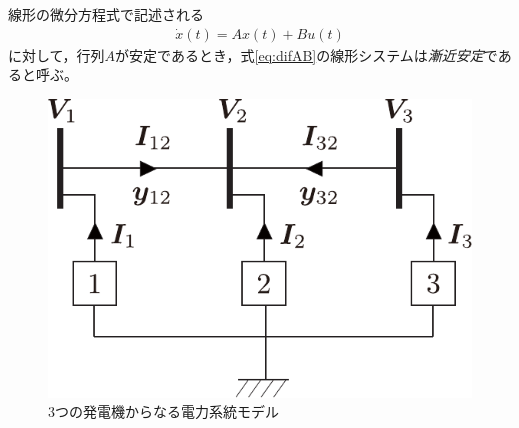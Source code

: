 \documentclass[tombow,dvipdfmx]{corona-a5}
\begin{document}
\begin{定義}\label{def:difsta}
線形の微分方程式で記述される
\begin{align}\label{eq:difAB}
\dot{x}(t)=Ax(t) +Bu(t)
\end{align}
に対して，行列$A$が安定であるとき，式\ref{eq:difAB}の線形システムは\emph{漸近安定}であると呼ぶ。
\end{定義}

\begin{figure}[t]
\centering
\includegraphics[width = .30\linewidth]{figs/3busex}
\caption{3つの発電機からなる電力系統モデル}
\label{fig:3genex}
\end{figure}
\end{document}

